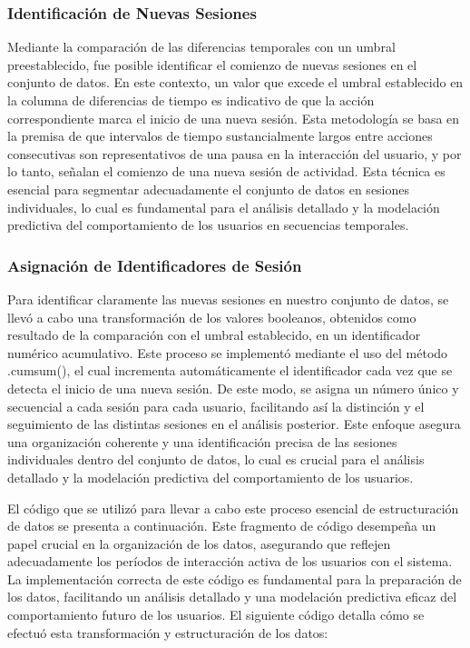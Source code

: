 \subsubsection{Identificación de Nuevas Sesiones}
Mediante la comparación de las diferencias temporales con un umbral preestablecido, fue posible identificar el comienzo de nuevas sesiones en el conjunto de datos. En este contexto, un valor que excede el umbral establecido en la columna de diferencias de tiempo es indicativo de que la acción correspondiente marca el inicio de una nueva sesión. Esta metodología se basa en la premisa de que intervalos de tiempo sustancialmente largos entre acciones consecutivas son representativos de una pausa en la interacción del usuario, y por lo tanto, señalan el comienzo de una nueva sesión de actividad. Esta técnica es esencial para segmentar adecuadamente el conjunto de datos en sesiones individuales, lo cual es fundamental para el análisis detallado y la modelación predictiva del comportamiento de los usuarios en secuencias temporales.

\subsubsection{Asignación de Identificadores de Sesión} 
Para identificar claramente las nuevas sesiones en nuestro conjunto de datos, se llevó a cabo una transformación de los valores booleanos, obtenidos como resultado de la comparación con el umbral establecido, en un identificador numérico acumulativo. Este proceso se implementó mediante el uso del método .cumsum(), el cual incrementa automáticamente el identificador cada vez que se detecta el inicio de una nueva sesión. De este modo, se asigna un número único y secuencial a cada sesión para cada usuario, facilitando así la distinción y el seguimiento de las distintas sesiones en el análisis posterior. Este enfoque asegura una organización coherente y una identificación precisa de las sesiones individuales dentro del conjunto de datos, lo cual es crucial para el análisis detallado y la modelación predictiva del comportamiento de los usuarios.

El código que se utilizó para llevar a cabo este proceso esencial de estructuración de datos se presenta a continuación. Este fragmento de código desempeña un papel crucial en la organización de los datos, asegurando que reflejen adecuadamente los períodos de interacción activa de los usuarios con el sistema. La implementación correcta de este código es fundamental para la preparación de los datos, facilitando un análisis detallado y una modelación predictiva eficaz del comportamiento futuro de los usuarios. El siguiente código detalla cómo se efectuó esta transformación y estructuración de los datos:


